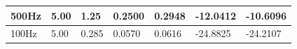 \documentclass{article}
\begin{document}
\begin{table}[H]
\begin{tabular}{|l|l|l|l|l|l|l|}
		500Hz     & 5.00                                                                      & 1.25                                                                           & 0.2500                                                                  & 0.2948                                                                             & -12.0412                                                                        & -10.6096                                                                                    \\ \hline
		100Hz     & 5.00                                                                      & 0.285                                                                          & 0.0570                                                                  & 0.0616                                                                             & -24.8825                                                                        & -24.2107                                                                                    \\ \hline
	\end{tabular}
\end{table}
\end{document}
